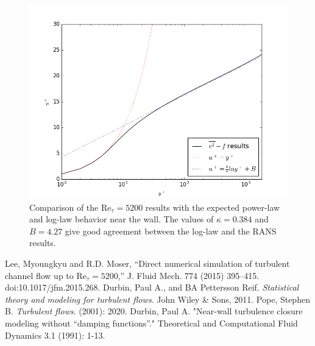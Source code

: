 \documentclass[a4paper,11pt]{article}
\begin{document}
\begin{figure}
 \centering
 \includegraphics[width=\textwidth]{loglaw_5200}
 \caption{Comparison of the $\mathrm{Re}_{\tau} = 5200$ results with the expected power-law and log-law behavior near the wall. The values of $\kappa = 0.384$ and $B = 4.27$ give good agreement between the log-law and the RANS results.}
 \label{fig:loglaw}
\end{figure}


\clearpage
\begin{thebibliography}{3}
Lee, Myoungkyu and R.D. Moser, ``Direct numerical simulation of turbulent channel flow up to $\mathrm{Re}_{\tau}=5200$,'' J. Fluid Mech. 774 (2015) 395–415. doi:10.1017/jfm.2015.268.
    Durbin, Paul A., and BA Pettersson Reif. \textit{Statistical theory and
modeling for turbulent flows}. John Wiley \& Sons, 2011.
        Pope, Stephen B. \textit{Turbulent flows}. (2001): 2020.
        Durbin, Paul A. "Near-wall turbulence closure modeling without “damping
functions”." Theoretical and Computational Fluid Dynamics 3.1 (1991): 1-13.
 
\newpage



\end{thebibliography}
\end{document}
